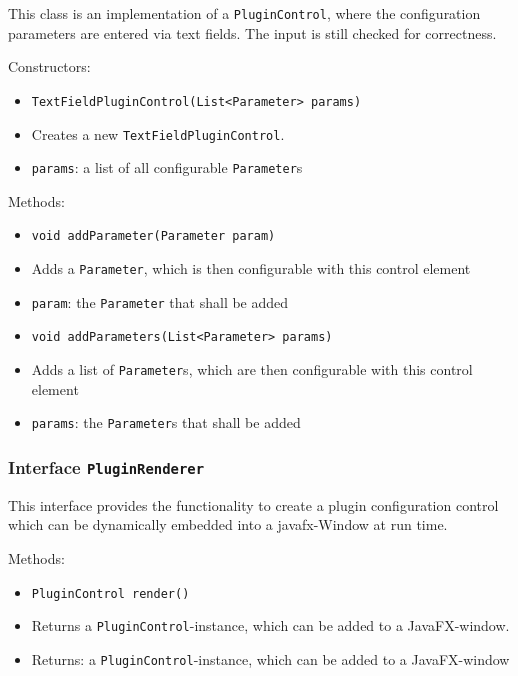 \documentclass[parskip=full,11pt]{scrartcl}
\begin{document}
This class is an implementation of a \texttt{PluginControl}, where the configuration parameters are entered via text fields. The input is still checked for correctness.

Constructors:

\begin{itemize}\itemsep -10pt
	\item \texttt{TextFieldPluginControl(List<Parameter> params)}
	\item[] Creates a new \texttt{TextFieldPluginControl}.
	\item[] \texttt{params}: a list of all configurable \texttt{Parameter}s
\end{itemize}

Methods:

\begin{itemize}\itemsep -10pt
	\item \texttt{void addParameter(Parameter param)}
	\item[] Adds a \texttt{Parameter}, which is then configurable with this control element
	\item[] \texttt{param}: the \texttt{Parameter} that shall be added
	\item \texttt{void addParameters(List<Parameter> params)}
	\item[] Adds a list of \texttt{Parameter}s, which are then configurable with this control element
	\item[] \texttt{params}: the \texttt{Parameter}s that shall be added
\end{itemize}

\subsubsection{Interface \texttt{PluginRenderer}}

This interface provides the functionality to create a plugin configuration control which can be dynamically embedded into a javafx-Window at run time.

Methods:

\begin{itemize}\itemsep -10pt
	\item \texttt{PluginControl render()}
	\item[] Returns a \texttt{PluginControl}-instance, which can be added to a JavaFX-window.
	\item[] Returns: a \texttt{PluginControl}-instance, which can be added to a JavaFX-window
\end{itemize}
\end{document}
